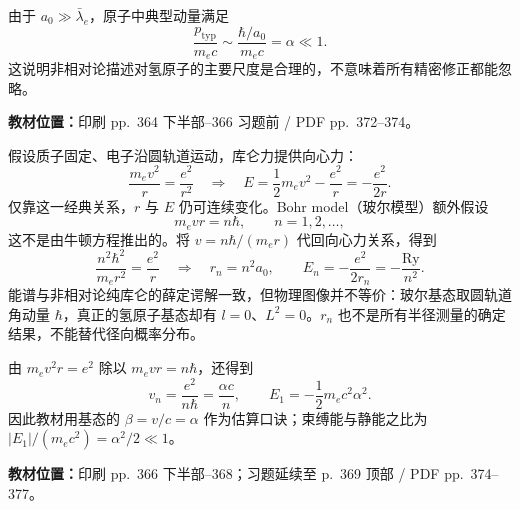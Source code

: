 由于 $a_0\gg\bar\lambda_e$，原子中典型动量满足
\begin{equation}
  \frac{p_{\mathrm{typ}}}{m_ec}
    \sim\frac{\hbar/a_0}{m_ec}=\alpha\ll1.
\end{equation}
这说明非相对论描述对氢原子的主要尺度是合理的，不意味着所有精密修正都能忽略。

\textbf{教材位置：}印刷 pp.~364 下半部--366 习题前 / PDF pp.~372--374。

假设质子固定、电子沿圆轨道运动，库仑力提供向心力：
\begin{equation}
  \frac{m_ev^2}{r}=\frac{e^2}{r^2}
  \quad\Longrightarrow\quad
  E=\frac12m_ev^2-\frac{e^2}{r}=-\frac{e^2}{2r}.
\end{equation}
仅靠这一经典关系，$r$ 与 $E$ 仍可连续变化。Bohr model（玻尔模型）额外假设
\begin{equation}
  m_evr=n\hbar,\qquad n=1,2,\ldots,
\end{equation}
这不是由牛顿方程推出的。将 $v=n\hbar/(m_er)$ 代回向心力关系，得到
\begin{equation}
  \frac{n^2\hbar^2}{m_er^2}=\frac{e^2}{r}
  \quad\Longrightarrow\quad
  \boxed{r_n=n^2a_0,\qquad E_n=-\frac{e^2}{2r_n}
        =-\frac{\mathrm{Ry}}{n^2}.}
\end{equation}
能谱与非相对论纯库仑的薛定谔解一致，但物理图像并不等价：玻尔基态取圆轨道角动量 $\hbar$，真正的氢原子基态却有 $l=0$、$L^2=0$。$r_n$ 也不是所有半径测量的确定结果，不能替代径向概率分布。

由 $m_ev^2r=e^2$ 除以 $m_evr=n\hbar$，还得到
\begin{equation}
  \boxed{v_n=\frac{e^2}{n\hbar}=\frac{\alpha c}{n},\qquad
  E_1=-\frac12m_ec^2\alpha^2.}
\end{equation}
因此教材用基态的 $\beta=v/c=\alpha$ 作为估算口诀；束缚能与静能之比为 $|E_1|/(m_ec^2)=\alpha^2/2\ll1$。


\textbf{教材位置：}印刷 pp.~366 下半部--368；习题延续至 p.~369 顶部 / PDF pp.~374--377。

